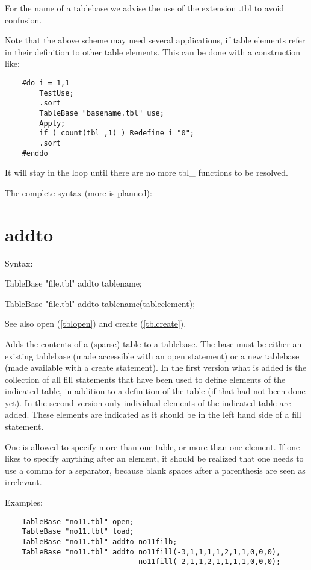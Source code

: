 For the name of a tablebase we advise the use of the extension 
.tbl to avoid confusion.

Note that the above scheme may need several applications, if table elements 
refer in their definition to other table elements. This can be done with a 
construction like:
\begin{verbatim}
    #do i = 1,1
        TestUse;
        .sort
        TableBase "basename.tbl" use;
        Apply;
        if ( count(tbl_,1) ) Redefine i "0";
        .sort
    #enddo
\end{verbatim}
It will stay in the loop until there are no more tbl\_ functions to be 
resolved.

The complete syntax (more is planned):


\section{addto}
\label{tbladdto}

\noindent Syntax:

TableBase "file.tbl" addto tablename;

TableBase "file.tbl" addto tablename(tableelement);

\noindent See also open (\ref{tblopen}) and create (\ref{tblcreate}).

\noindent Adds the contents of a (sparse) table 
to a tablebase. The base must be either an existing tablebase (made 
accessible with an open statement) or a new tablebase (made available with 
a create statement). In the first version what is added is the collection 
of all fill statements that have been used to define elements of the 
indicated table, in addition to a definition of the table (if that had not 
been done yet). In the second version only individual elements of the 
indicated table are added. These elements are indicated as it should be in 
the left hand side of a fill statement.

\noindent One is allowed to specify more than one table, or more than one 
element. If one likes to specify anything after an element, it should be 
realized that one needs to use a comma for a separator, because blank 
spaces after a parenthesis are seen as irrelevant.

\noindent Examples:
\begin{verbatim}
    TableBase "no11.tbl" open;
    TableBase "no11.tbl" load;
    TableBase "no11.tbl" addto no11filb;
    TableBase "no11.tbl" addto no11fill(-3,1,1,1,1,2,1,1,0,0,0),
                               no11fill(-2,1,1,2,1,1,1,1,0,0,0);
\end{verbatim}

